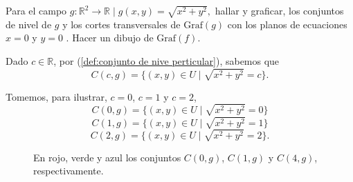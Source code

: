 \begin{example}\label{example:ej2graf} Para  el campo  $g: \mathbb{R}^{2} \rightarrow \mathbb{R} \;|\; g(x,y) = \sqrt{x^2+y^2},$  hallar y graficar,  los conjuntos de nivel de $g$ y los cortes transversales  de  $\text{Graf}(g)$ con los planos de ecuaciones $x=0$ y $y=0$ .  Hacer un dibujo de  $\text{Graf}(f)$.  




  
Dado $c \in \mathbb{R}$, por (\ref{def:conjunto de nive perticular}), sabemos que   $$C(c,g)=\{(x,y) \in U \;|\;   \sqrt{x^2+y^2}  =c \}.$$
    
Tomemos, para ilustrar,  $c=0$, $c=1$ y $c=2$, 
    \[
        C(0,g)=\{(x,y) \in U \;|\; \sqrt{x^2+y^2}=0 \}
        \]
         \[
        C(1,g)=\{(x,y) \in U \;|\; \sqrt{x^2+y^2}=1 \}
        \]
         \[
        C(2,g)=\{(x,y) \in U \;|\; \sqrt{x^2+y^2}=2 \}.
         \]
    
    
  
    
\begin{figure}[H]
     \begin{center}
  \end{center}
  \caption{En rojo,  verde y azul  los conjuntos $C(0,g)$, $C(1,g)$ y $C(4,g)$, respectivamente.}
   \end{figure}
    

\end{example}
